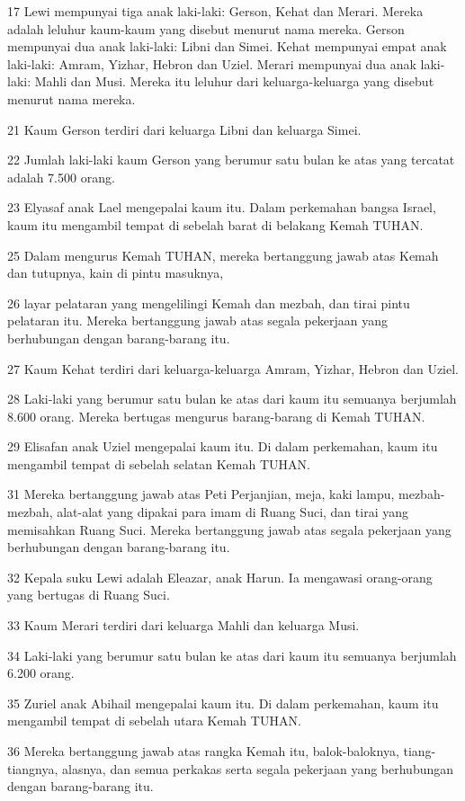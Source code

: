 \par 17 Lewi mempunyai tiga anak laki-laki: Gerson, Kehat dan Merari. Mereka adalah leluhur kaum-kaum yang disebut menurut nama mereka. Gerson mempunyai dua anak laki-laki: Libni dan Simei. Kehat mempunyai empat anak laki-laki: Amram, Yizhar, Hebron dan Uziel. Merari mempunyai dua anak laki-laki: Mahli dan Musi. Mereka itu leluhur dari keluarga-keluarga yang disebut menurut nama mereka.
\par 21 Kaum Gerson terdiri dari keluarga Libni dan keluarga Simei.
\par 22 Jumlah laki-laki kaum Gerson yang berumur satu bulan ke atas yang tercatat adalah 7.500 orang.
\par 23 Elyasaf anak Lael mengepalai kaum itu. Dalam perkemahan bangsa Israel, kaum itu mengambil tempat di sebelah barat di belakang Kemah TUHAN.
\par 25 Dalam mengurus Kemah TUHAN, mereka bertanggung jawab atas Kemah dan tutupnya, kain di pintu masuknya,
\par 26 layar pelataran yang mengelilingi Kemah dan mezbah, dan tirai pintu pelataran itu. Mereka bertanggung jawab atas segala pekerjaan yang berhubungan dengan barang-barang itu.
\par 27 Kaum Kehat terdiri dari keluarga-keluarga Amram, Yizhar, Hebron dan Uziel.
\par 28 Laki-laki yang berumur satu bulan ke atas dari kaum itu semuanya berjumlah 8.600 orang. Mereka bertugas mengurus barang-barang di Kemah TUHAN.
\par 29 Elisafan anak Uziel mengepalai kaum itu. Di dalam perkemahan, kaum itu mengambil tempat di sebelah selatan Kemah TUHAN.
\par 31 Mereka bertanggung jawab atas Peti Perjanjian, meja, kaki lampu, mezbah-mezbah, alat-alat yang dipakai para imam di Ruang Suci, dan tirai yang memisahkan Ruang Suci. Mereka bertanggung jawab atas segala pekerjaan yang berhubungan dengan barang-barang itu.
\par 32 Kepala suku Lewi adalah Eleazar, anak Harun. Ia mengawasi orang-orang yang bertugas di Ruang Suci.
\par 33 Kaum Merari terdiri dari keluarga Mahli dan keluarga Musi.
\par 34 Laki-laki yang berumur satu bulan ke atas dari kaum itu semuanya berjumlah 6.200 orang.
\par 35 Zuriel anak Abihail mengepalai kaum itu. Di dalam perkemahan, kaum itu mengambil tempat di sebelah utara Kemah TUHAN.
\par 36 Mereka bertanggung jawab atas rangka Kemah itu, balok-baloknya, tiang-tiangnya, alasnya, dan semua perkakas serta segala pekerjaan yang berhubungan dengan barang-barang itu.
